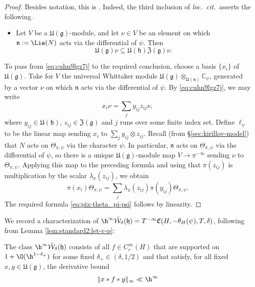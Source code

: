 \begin{proof}
  Besides notation, this is \cite[Lemma 3]{MR2733072}.  Indeed, the third inclusion of \emph{loc.\ cit.}\ asserts the following.
  \begin{itemize}
  \item Let $V$ be a $\mathfrak{U}(\mathfrak{g})$-module, and let $\nu \in V$ be an element on which $\mathfrak{n} := \Lie(N)$ acts via the differential of $\psi$.  Then
    \begin{equation}\label{eq:cuhn9lgz7j}
      \mathfrak{U}(\mathfrak{g}) \nu \subseteq \mathfrak{U}(\mathfrak{h}) \mathfrak{Z}(\mathfrak{g}) \nu.
    \end{equation}
  \end{itemize}
  To pass from \eqref{eq:cuhn9lgz7j} to the required conclusion, choose a basis $\{x_i\}$ of $\mathfrak{U}(\mathfrak{g})$.  Take for $V$ the universal Whittaker module $\mathfrak{U}(\mathfrak{g}) \otimes_{\mathfrak{U}(\mathfrak{n})} \mathbb{C}_\psi$, generated by a vector $\nu$ on which $\mathfrak{n}$ acts via the differential of $\psi$.  By \eqref{eq:cuhn9lgz7j}, we may write
  \begin{equation*}
    x_i \nu = \sum_j y_{i j} z_{i j} \nu,
  \end{equation*}
  where $y_{i j} \in \mathfrak{U}(\mathfrak{h})$, $z_{i j} \in \mathfrak{Z}(\mathfrak{g})$ and $j$ runs over some finite index set.  Define $\ell_\psi$ to be the linear map sending $x_i$ to $\sum_j y_{i j} \otimes z_{i j}$.  Recall (from \S\ref{sec:kirillov-model}) that $N$ acts on $\Theta_{\pi,\psi}$ via the character $\psi$.  In particular, $\mathfrak{n}$ acts on $\Theta_{\pi,\psi}$ via the differential of $\psi$, so there is a unique $\mathfrak{U}(\mathfrak{g})$-module map $V \rightarrow \pi^{-\infty}$ sending $\nu$ to $\Theta_{\pi,\psi}$.  Applying this map to the preceding formula and using that $\pi(z_{i j})$ is multiplication by the scalar $\lambda_\pi(z_{i j})$, we obtain
  \begin{equation*}
    \pi(x_i) \Theta_{\pi,\psi} = \sum_j \lambda_\pi(z_{i j}) \pi(y_{i j}) \Theta_{\pi,\psi}.
  \end{equation*}
  The required formula \eqref{eq:pix-theta_pi-psi} follows by linearity.
\end{proof}

We record a characterization of $\h^\infty \tilde{\mathcal{W}}_\delta(\mathfrak{h}) = T^{-\infty} \mathfrak{C}(H, -\theta_H(\psi), T, \delta)$, following from Lemma \ref{lem:standard2:let-v-p}:
\begin{lemma}\label{lem:scratch-research:hinfty-tild-cons}
  The class $\h^\infty \tilde{\mathcal{W}}_{\delta}(\mathfrak{h})$ consists of all $f \in C_c^\infty(H)$ that are supported on $1 + \O(\h^{1 - \delta_+})$ for some fixed $\delta_+ \in (\delta,1/2)$ and that satisfy, for all fixed $x,y \in \mathfrak{U}(\mathfrak{g})$, the derivative bound
  \begin{equation}\label{eq:x-ast-f}
    \|x \ast f \ast y\|_{\infty} \ll \h^\infty
  \end{equation}
\end{lemma}



